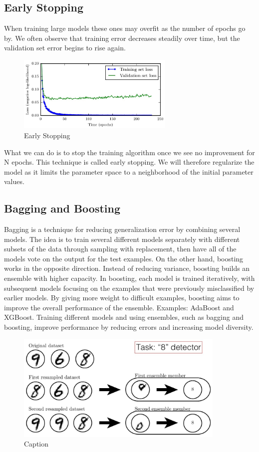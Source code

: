 \subsection{Early Stopping}

When training large models these ones may overfit as the number of epochs go by. We often observe that training error decreases steadily over time, but the validation set error begins to rise again.

\begin{figure}[htp]
    \centering
    \includegraphics[width=7.5cm]{Plots/early-stopping.jpg}
    \caption{Early Stopping}
    \label{fig:early-stopping}
\end{figure}

\noindent What we can do is to stop the training algorithm once we see no improvement for N epochs. This technique is called early stopping. We will therefore regularize the model as it limits the parameter space to a neighborhood of the initial parameter values.

\subsection{Bagging and Boosting}

Bagging is a technique for reducing generalization error by combining several models. The idea is to train several different models separately with different subsets of the data through sampling with replacement, then have all of the models vote on the output for the test examples. On the other hand, boosting works in the opposite direction. Instead of reducing variance, boosting builds an ensemble with higher capacity. In boosting, each model is trained iteratively, with subsequent models focusing on the examples that were previously misclassified by earlier models. By giving more weight to difficult examples, boosting aims to improve the overall performance of the ensemble. Examples: AdaBoost and XGBoost. Training different models and using ensembles, such as bagging and boosting, improve performance by reducing errors and increasing model diversity.


\begin{figure}[h]
    \centering
    \includegraphics[width=10cm]{Images/bagging.jpg}
    \caption{Caption}
    \label{fig:bagging}
\end{figure}

